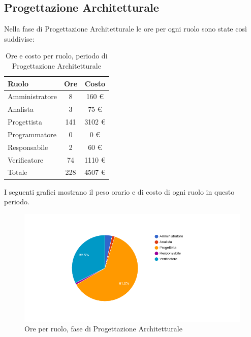\subsection{Progettazione Architetturale}
Nella fase di Progettazione Architetturale le ore per ogni ruolo sono state cos\`i suddivise:

\begin{table}[H]
	\centering
	\begin{tabular}{ l c c }
		\textbf{Ruolo} & \textbf{Ore} & \textbf{Costo} \\
		\hline
		Amministratore & 8 & 160 \euro{} \\
		Analista & 3 & 75 \euro{} \\
		Progettista & 141 & 3102 \euro{} \\
		Programmatore & 0 & 0 \euro{} \\
		Responsabile & 2 & 60 \euro{} \\
		Verificatore & 74 & 1110 \euro{} \\
		\hline
		Totale & 228 & 4507 \euro{} \\
		\hline
	\end{tabular}
	\caption{Ore e costo per ruolo, periodo di Progettazione Architetturale}
\end{table}

I seguenti grafici mostrano il peso orario e di costo di ogni ruolo in questo periodo.

\begin{figure}[H]
  \begin{center}
    \includegraphics[width=15cm]{res/img/prospettoEconomico/orePerRuoloProgettazioneArchitetturale.png}
  \caption{Ore per ruolo, fase di Progettazione Architetturale}
  \end{center} 
\end{figure}  

